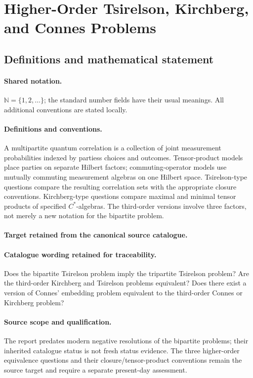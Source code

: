 \documentclass[11pt]{article}
\begin{document}
\section{Higher-Order Tsirelson, Kirchberg, and Connes Problems}\label{statement}

\subsection{Definitions and mathematical statement}

\paragraph{Shared notation.}$\mathbb N=\{1,2,\ldots\}$; the standard number fields have their usual meanings. All additional conventions are stated locally.


\paragraph{Definitions and conventions.}
A multipartite quantum correlation is a collection of joint measurement probabilities indexed by parties\textquotesingle s choices and outcomes. Tensor-product models place parties on separate Hilbert factors; commuting-operator models use mutually commuting measurement algebras on one Hilbert space. Tsirelson-type questions compare the resulting correlation sets with the appropriate closure conventions. Kirchberg-type questions compare maximal and minimal tensor products of specified $C^*$-algebras. The third-order versions involve three factors, not merely a new notation for the bipartite problem.

\paragraph{Target retained from the canonical source catalogue.}
\paragraph{Catalogue wording retained for traceability.}
Does the bipartite Tsirelson problem imply the tripartite Tsirelson problem? Are the third-order Kirchberg and Tsirelson problems equivalent? Does there exist a version of Connes' embedding problem equivalent to the third-order Connes or Kirchberg problem?

\paragraph{Source scope and qualification.}
The report predates modern negative resolutions of the bipartite problems; their inherited catalogue status is not fresh status evidence. The three higher-order equivalence questions and their closure/tensor-product conventions remain the source target and require a separate present-day assessment.
\end{document}
